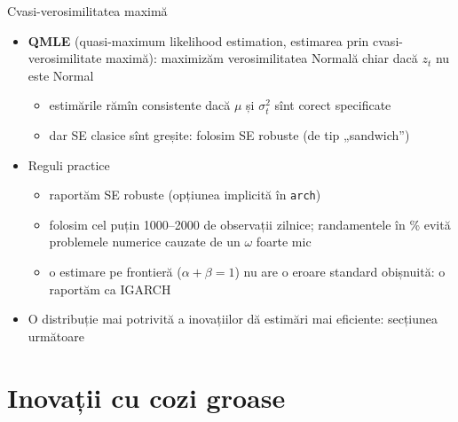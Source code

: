 \begin{frame}{Cvasi-verosimilitatea maximă}
\itemsize{\small}
\begin{itemize}
    \item \textbf{QMLE} (quasi-maximum likelihood estimation, estimarea prin cvasi-verosimilitate maximă): maximizăm verosimilitatea Normală chiar dacă $z_t$ nu este Normal
    \begin{itemize}
        \item estimările rămîn consistente dacă $\mu$ și $\sigma_t^2$ sînt corect specificate 
        \item dar SE clasice sînt greșite: folosim SE robuste (de tip „sandwich”)
    \end{itemize}
    \item Reguli practice
    \begin{itemize}
        \item raportăm SE robuste (opțiunea implicită în \texttt{arch})
        \item folosim cel puțin 1000--2000 de observații zilnice; randamentele în \% evită problemele numerice cauzate de un $\omega$ foarte mic
        \item o estimare pe frontieră ($\alpha + \beta = 1$) nu are o eroare standard obișnuită: o raportăm ca IGARCH
    \end{itemize}
    \item O distribuție mai potrivită a inovațiilor dă estimări mai eficiente: secțiunea următoare
\end{itemize}
\end{frame}


\section{Inovații cu cozi groase}

